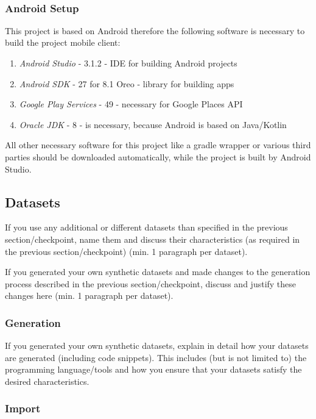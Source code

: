 \


\subsubsection{Android Setup}
\label{sec:Android-Setup}
This project is based on Android therefore the following software is necessary to build the project mobile client:

\begin{enumerate}
	\item \textit{Android Studio} - 3.1.2 - IDE for building Android projects
	\item \textit{Android SDK} - 27 for 8.1 Oreo - library for building apps
	\item \textit{Google Play  Services} - 49 - necessary for Google Places API
	\item \textit{Oracle JDK} - 8 - is necessary, because Android is based on Java/Kotlin
\end{enumerate}

All other necessary software for this project like a gradle wrapper or various third parties should be downloaded automatically, while the project is built by Android Studio.


\subsection{Datasets}

If you use any additional or different datasets than specified in the previous
section/checkpoint, name them and discuss their characteristics (as required in
the previous section/checkpoint) (min. 1 paragraph per dataset).

If you generated your own synthetic datasets and made changes to the generation
process described in the previous section/checkpoint, discuss and justify these
changes here (min. 1 paragraph per dataset).

\subsubsection{Generation}

If you generated your own synthetic datasets, explain in detail how your
datasets are generated (including code snippets). This includes (but is not
limited to) the programming language/tools and how you ensure that your datasets
satisfy the desired characteristics.

\subsubsection{Import}

